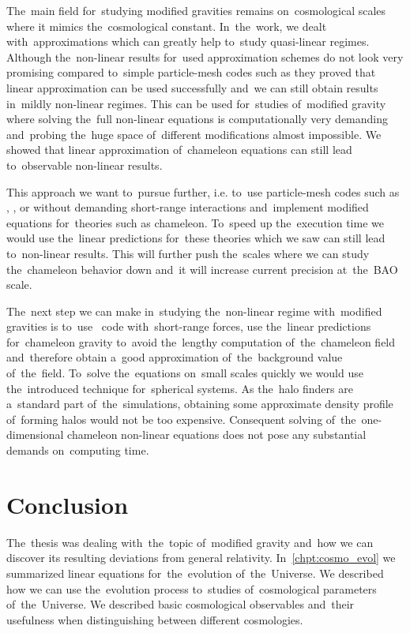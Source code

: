 The~main field for~studying modified gravities remains on~cosmological scales where it mimics the~cosmological constant. In~the~work, we dealt with~approximations which can greatly help to~study quasi-linear regimes. Although the~non-linear results for~used approximation schemes do not look very promising compared to~simple particle-mesh codes such as  they proved that linear approximation can be used successfully and~we can still obtain results in~mildly non-linear regimes. This can be used for~studies of~modified gravity where solving the~full non-linear equations is computationally very demanding and~probing the~huge space of~different modifications almost impossible. We showed that linear approximation of~chameleon equations can still lead to~observable non-linear results.

This approach we want to~pursue further, i.e. to~use particle-mesh codes such as , , or  without demanding short-range interactions and~implement modified equations for~theories such as chameleon. To~speed up the~execution time we would use the~linear predictions for~these theories which we saw can still lead to~non-linear results. This will further push the~scales where we can study the~chameleon behavior down and~it will increase current precision at~the~BAO scale.

The~next step we can make in~studying the~non-linear regime with~modified gravities is to~use \nbody\ code with~short-range forces, use the~linear predictions for~chameleon gravity to~avoid the~lengthy computation of~the~chameleon field and~therefore obtain a~good approximation of~the~background value of~the~field. To~solve the~equations on~small scales quickly we would use the~introduced technique for~spherical systems. As the~halo finders are a~standard part of~the~simulations, obtaining some approximate density profile of~forming halos would not be too expensive. Consequent solving of~the~one-dimensional chameleon non-linear equations does not pose any substantial demands on~computing time.\clearpage{}
\clearpage{}\chapter*{Conclusion}
The~thesis was dealing with~the~topic of~modified gravity and~how we can discover its resulting deviations from general relativity. In~\autoref{chpt:cosmo_evol} we summarized linear equations for~the~evolution of~the~Universe. We described how we can use the~evolution process to~studies of~cosmological parameters of~the~Universe. We described basic cosmological observables and~their usefulness when distinguishing between different cosmologies.

